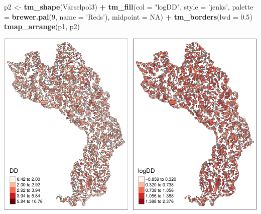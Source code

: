 \documentclass[11pt,]{article}
\newenvironment{Shaded}{\begin{snugshade}}{\end{snugshade}}
\newcommand{\KeywordTok}[1]{\textcolor[rgb]{0.13,0.29,0.53}{\textbf{#1}}}
\newcommand{\DataTypeTok}[1]{\textcolor[rgb]{0.13,0.29,0.53}{#1}}
\newcommand{\DecValTok}[1]{\textcolor[rgb]{0.00,0.00,0.81}{#1}}
\newcommand{\FloatTok}[1]{\textcolor[rgb]{0.00,0.00,0.81}{#1}}
\newcommand{\StringTok}[1]{\textcolor[rgb]{0.31,0.60,0.02}{#1}}
\newcommand{\OtherTok}[1]{\textcolor[rgb]{0.56,0.35,0.01}{#1}}
\newcommand{\OperatorTok}[1]{\textcolor[rgb]{0.81,0.36,0.00}{\textbf{#1}}}
\newcommand{\NormalTok}[1]{#1}
\begin{document}
\begin{Shaded}
\begin{Highlighting}[]
\NormalTok{p2 <-}\StringTok{ }\KeywordTok{tm_shape}\NormalTok{(Varselpol3) }\OperatorTok{+}
\StringTok{  }\KeywordTok{tm_fill}\NormalTok{(}\DataTypeTok{col =} \StringTok{"logDD"}\NormalTok{, }\DataTypeTok{style =} \StringTok{'jenks'}\NormalTok{,}
          \DataTypeTok{palette =} \KeywordTok{brewer.pal}\NormalTok{(}\DecValTok{9}\NormalTok{, }\DataTypeTok{name =} \StringTok{'Reds'}\NormalTok{), }\DataTypeTok{midpoint =} \OtherTok{NA}\NormalTok{) }\OperatorTok{+}
\StringTok{  }\KeywordTok{tm_borders}\NormalTok{(}\DataTypeTok{lwd =} \FloatTok{0.5}\NormalTok{)}
\KeywordTok{tmap_arrange}\NormalTok{(p1, p2)}
\end{Highlighting}
\end{Shaded}

\includegraphics{proyecto_f_files/figure-latex/unnamed-chunk-72-2.pdf}

\begin{Shaded}
\end{Shaded}
\end{document}
